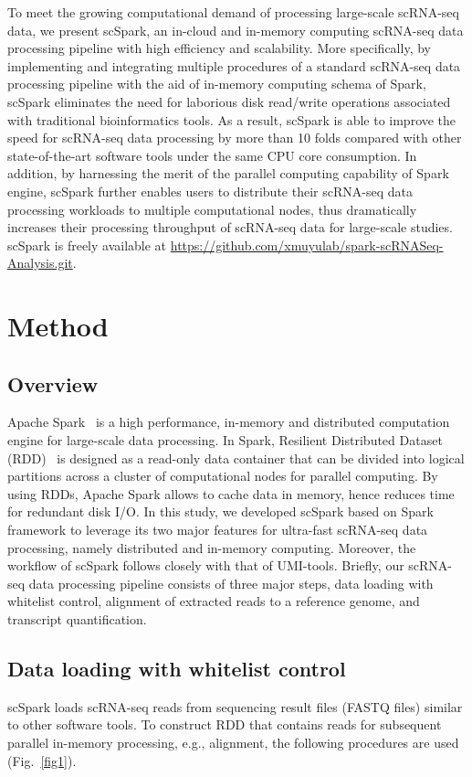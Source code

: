 \documentclass[conference]{IEEEtran}
\begin{document}
To meet the growing computational demand of processing large-scale scRNA-seq data, we present scSpark, an in-cloud and in-memory computing scRNA-seq data processing pipeline with high efficiency and scalability. 
More specifically, by implementing and integrating multiple procedures of a standard scRNA-seq data processing pipeline with the aid of in-memory computing schema of Spark, scSpark eliminates the need for laborious disk read/write operations associated with traditional bioinformatics tools. 
As a result, scSpark is able to improve the speed for scRNA-seq data processing by more than 10 folds compared with other state-of-the-art software tools under the same CPU core consumption. In addition, by harnessing the merit of the parallel computing capability of Spark engine, scSpark further enables users to distribute their scRNA-seq data processing workloads to multiple computational nodes, thus dramatically increases their processing throughput of scRNA-seq data for large-scale studies. 
scSpark is freely available at \url{https://github.com/xmuyulab/spark-scRNASeq-Analysis.git}.

\section{Method}
\subsection{Overview}
Apache Spark~\cite{zaharia2010spark} is a high performance, in-memory and distributed computation engine for large-scale data processing. 
In Spark, Resilient Distributed Dataset (RDD)~\cite{Zaharia2012Resilient} is designed as a read-only data container that can be divided into logical partitions across a cluster of computational nodes for parallel computing. 
By using RDDs, Apache Spark allows to cache data in memory, hence reduces time for redundant disk I/O.
In this study, we developed scSpark based on Spark framework to leverage its two major features for ultra-fast scRNA-seq data processing, namely distributed and in-memory computing. 
Moreover, the workflow of scSpark follows closely with that of UMI-tools. Briefly, our scRNA-seq data processing pipeline consists of three major steps, data loading with whitelist control, alignment of extracted reads to a reference genome, and transcript quantification. 

\subsection{Data loading with whitelist control}
scSpark loads scRNA-seq reads from sequencing result files (FASTQ files) similar to other software tools. To construct RDD that contains reads for subsequent parallel in-memory processing, e.g., alignment, the following procedures are used (Fig.~\ref{fig1}).
\end{document}
